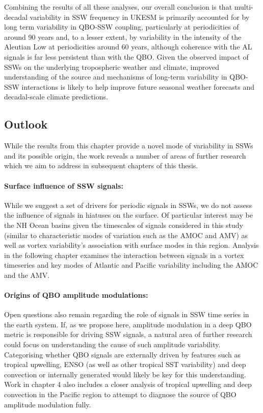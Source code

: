 Combining the results of all these analyses, our overall conclusion is that multi-decadal variability in SSW frequency in UKESM is primarily accounted for by long term variability in QBO-SSW coupling, particularly at periodicities of around 90 years and, to a lesser extent, by variability in the intensity of the Aleutian Low at periodicities around 60 years, although coherence with the AL signals is far less persistent than with the QBO. Given the observed impact of SSWs on the underlying tropospheric weather and climate, improved understanding of the source and mechanisms of long-term variability in QBO-SSW interactions is likely to help improve future seasonal weather forecasts and decadal-scale climate predictions.

\subsection*{Outlook}
While the results from this chapter provide a novel mode of variability in SSWs and its possible origin, the work reveals a number of areas of further research which we aim to address in subsequent chapters of this thesis.

\paragraph{Surface influence of SSW signals:} While we suggest a set of drivers for periodic signals in SSWs, we do not assess the influence of signals in hiatuses on the surface. Of particular interest may be the NH Ocean basins given the timescales of signals considered in this study (similar to characteristic modes of variation such as the AMOC and AMV) as well as vortex variability's association with surface modes in this region. Analysis in the following chapter examines the interaction between signals in a vortex timeseries and key modes of Atlantic and Pacific variability including the AMOC and the AMV.

\paragraph{Origins of QBO amplitude modulations:} Open questions also remain regarding the role of signals in SSW time series in the earth system. If, as we propose here, amplitude modulation in a deep QBO metric is responsible for driving SSW signals, a natural area of further research could focus on understanding the cause of such amplitude variability. Categorising whether QBO signals are externally driven by features such as tropical upwelling, ENSO (as well as other tropical SST variability) and deep convection or internally generated would likely be key for this understanding. Work in chapter 4 also includes a closer analysis of tropical upwelling and deep convection in the Pacific region to attempt to diagnose the source of QBO amplitude modulation fully.

